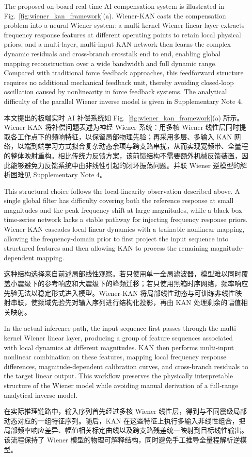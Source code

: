 \documentclass[sn-nature]{sn-jnl}
\newif\ifCNENEnglish
\newif\ifCNENBilingual
\newcommand{\CNEN}[2]{%
    \ifCNENBilingual
        #1%
        \if\relax\detokenize{#2}\relax\else\par #2\fi%
    \else
        \ifCNENEnglish
            #2%
        \else
            #1%
        \fi
    \fi
}
\begin{document}
\CNEN{本文提出的板端实时 AI 补偿系统如 Fig.~\ref{fig:wiener_kan_framework}(a) 所示。Wiener-KAN 将补偿问题表述为神经 Wiener 系统：用多核 Wiener 线性层同时提取各工作点下的频响特征，以保留局部物理先验；再采用多层、多输入 KAN 网络，以端到端学习方式拟合复杂动态余项与跨支路串扰，从而实现宽频带、全量程的整体映射重构。相比传统力反馈方案，该前馈结构不需要额外机械反馈装置，因此能够避免力反馈系统中由非线性引起的闭环振荡问题。并联 Wiener 逆模型的解析困难见 Supplementary Note 4。}{The proposed on-board real-time AI compensation system is illustrated in Fig.~\ref{fig:wiener_kan_framework}(a). Wiener-KAN casts the compensation problem into a neural Wiener system: a multi-kernel Wiener linear layer extracts frequency response features at different operating points to retain local physical priors, and a multi-layer, multi-input KAN network then learns the complex dynamic residuals and cross-branch crosstalk end to end, enabling global mapping reconstruction over a wide bandwidth and full dynamic range. Compared with traditional force feedback approaches, this feedforward structure requires no additional mechanical feedback unit, thereby avoiding closed-loop oscillation caused by nonlinearity in force feedback systems. The analytical difficulty of the parallel Wiener inverse model is given in Supplementary Note 4.%
}

\CNEN{这种结构选择来自前述局部线性观察。若只使用单一全局滤波器，模型难以同时覆盖小震级下的参考响应和大震级下的峰频迁移；若只使用黑箱时序网络，频率响应先验无法以稳定形式进入模型。Wiener-KAN 将局部线性动态与可训练非线性映射串联，使频域先验先对输入序列进行结构化投影，再由 KAN 处理剩余的幅值相关映射。}{This structural choice follows the local-linearity observation described above. A single global filter has difficulty covering both the reference response at small magnitudes and the peak-frequency shift at large magnitudes, while a black-box time-series network lacks a stable pathway for injecting frequency response priors. Wiener-KAN cascades local linear dynamics with a trainable nonlinear mapping, allowing the frequency-domain prior to first project the input sequence into structured features and then allowing KAN to process the remaining magnitude-dependent mapping.}

\CNEN{在实际推理链路中，输入序列首先经过多核 Wiener 线性层，得到与不同震级局部动态对应的一组特征序列。随后，KAN 在这些特征上执行多输入非线性组合，把局部频率响应差异、幅值相关标定曲线以及跨支路残差统一映射到目标线性输出。该流程保持了 Wiener 模型的物理可解释结构，同时避免手工推导全量程解析逆模型。}{In the actual inference path, the input sequence first passes through the multi-kernel Wiener linear layer, producing a group of feature sequences associated with local dynamics at different magnitudes. KAN then performs multi-input nonlinear combination on these features, mapping local frequency response differences, magnitude-dependent calibration curves, and cross-branch residuals to the target linear output. This workflow preserves the physically interpretable structure of the Wiener model while avoiding manual derivation of a full-range analytical inverse model.}
\end{document}
